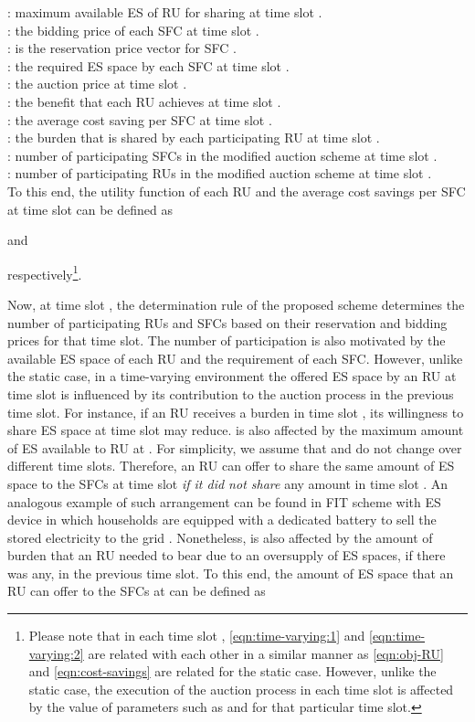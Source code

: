 \documentclass[journal,10pt]{IEEEtran}
\begin{document}
: maximum available ES of RU  for sharing at time slot .\\
: the bidding price of each SFC  at time slot .\\
: is the reservation price vector for SFC .\\
: the required ES space by each SFC  at time slot .\\
: the auction price at time slot .\\
: the benefit that each RU  achieves at time slot .\\
: the average cost saving per SFC at time slot .\\
: the burden that is shared by each participating RU at time slot .\\
: number of participating SFCs in the modified auction scheme at time slot .\\
: number of participating RUs in the modified auction scheme at time slot .\\
To this end, the utility function  of each RU  and the average cost savings  per SFC at time slot  can be defined as

and

respectively\footnote{Please note that in each time slot , \eqref{eqn:time-varying:1} and \eqref{eqn:time-varying:2} are related with each other in a similar manner as \eqref{eqn:obj-RU} and \eqref{eqn:cost-savings} are related for the static case. However, unlike the static case, the execution of the auction process in each time slot  is affected by the value of parameters such as  and  for that particular time slot.}. 

Now, at time slot , the determination rule of the proposed scheme determines the number of participating RUs and SFCs based on their reservation and bidding prices for that time slot. The number of participation is also motivated by the available ES space of each RU and the requirement of each SFC. However, unlike the static case, in a time-varying environment the offered ES space by an RU at time slot  is influenced by its contribution to the auction process in the previous time slot. For instance, if an RU  receives a burden  in time slot , its willingness to share ES space  at time slot  may reduce.  is also affected by the  maximum amount of ES  available to RU  at . For simplicity, we assume that  and  do not change over different time slots. Therefore, an RU  can offer to share the same amount of ES space  to the SFCs at time slot  \emph{if it did not share} any amount in time slot . An analogous example of such arrangement can be found in FIT scheme with ES device in which households are equipped with a dedicated battery to sell the stored electricity to the grid \cite{Goran:2011}. Nonetheless,  is also affected by the amount of burden  that an RU needed to bear due to an oversupply of ES spaces, if there was any, in the previous time slot. To this end, the amount of ES space that an RU  can offer to the SFCs at  can be defined as
\end{document}
